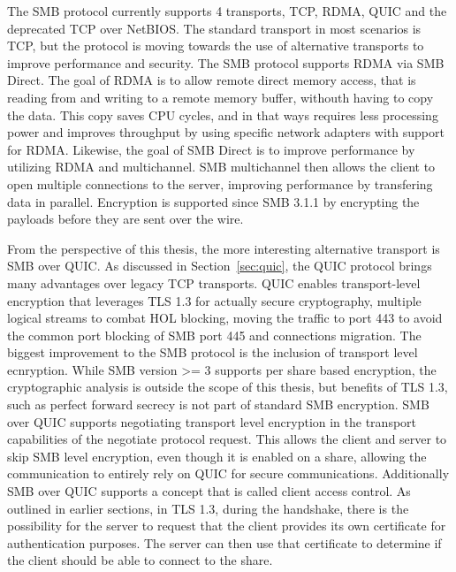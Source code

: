 \documentclass[english, 12pt, a4paper, elec, utf8, a-2b, online]{aaltothesis}
\begin{document}
The SMB protocol currently supports 4 transports, TCP, RDMA, QUIC and the
deprecated TCP over NetBIOS. The standard transport in most scenarios is TCP,
but the protocol is moving towards the use of alternative transports to improve
performance and security. The SMB protocol supports RDMA via SMB Direct. The goal
of RDMA is to allow remote direct memory access, that is reading from and writing
to a remote memory buffer, withouth having to copy the data. This copy saves CPU
cycles, and in that ways requires less processing power and improves throughput
by using specific network adapters with support for RDMA\cite{rfc5040}.
Likewise, the goal of SMB Direct is to improve performance by utilizing RDMA
and multichannel. SMB multichannel then allows the client to open multiple connections
to the server, improving performance by transfering data in parallel. Encryption is
supported since SMB 3.1.1 by encrypting the payloads before they are sent over the
wire\cite{smb_direct}.

From the perspective of this thesis, the more interesting alternative transport is
SMB over QUIC. As discussed in Section~\ref{sec:quic}, the QUIC protocol brings
many advantages over legacy TCP transports. QUIC enables transport-level encryption
that leverages TLS 1.3 for actually secure cryptography, multiple logical streams
to combat HOL blocking, moving the traffic to port 443 to avoid the common port
blocking of SMB port 445 and connections migration. The biggest improvement to the
SMB protocol is the inclusion of transport level ecnryption. While SMB version >= 3
supports per share based encryption, the cryptographic analysis is outside the scope
of this thesis, but benefits of TLS 1.3, such as perfect forward secrecy is not
part of standard SMB encryption\cite{smb_quic}. SMB over QUIC supports negotiating
transport level encryption in the transport capabilities of the negotiate protocol
request. This allows the client and server to skip SMB level encryption, even though
it is enabled on a share, allowing the communication to entirely rely on QUIC for
secure communications\cite{smb2_tech}. Additionally SMB over QUIC supports a concept
that is called client access control. As outlined in earlier sections, in TLS 1.3,
during the handshake,  there is the possibility for the server to request that the client
provides its own certificate for authentication purposes. The server can then use
that certificate to determine if the client should be able to connect to the share\cite{smb_quic_cac}.

\clearpage
\end{document}
